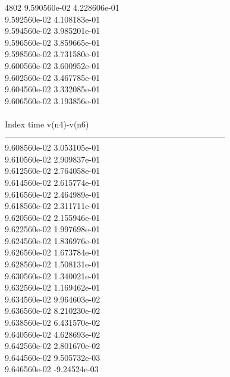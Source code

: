 4802	9.590560e-02	4.228606e-01	\\ 	9.592560e-02	4.108183e-01	\\ 	9.594560e-02	3.985201e-01	\\ 	9.596560e-02	3.859665e-01	\\ 	9.598560e-02	3.731580e-01	\\ 	9.600560e-02	3.600952e-01	\\ 	9.602560e-02	3.467785e-01	\\ 	9.604560e-02	3.332085e-01	\\ 	9.606560e-02	3.193856e-01	\\ \hline
\\ \hline
Index   time            v(n4)-v(n6)     \\ \hline
--------------------------------------------------------------------------------\\ 	9.608560e-02	3.053105e-01	\\ 	9.610560e-02	2.909837e-01	\\ 	9.612560e-02	2.764058e-01	\\ 	9.614560e-02	2.615774e-01	\\ 	9.616560e-02	2.464989e-01	\\ 	9.618560e-02	2.311711e-01	\\ 	9.620560e-02	2.155946e-01	\\ 	9.622560e-02	1.997698e-01	\\ 	9.624560e-02	1.836976e-01	\\ 	9.626560e-02	1.673784e-01	\\ 	9.628560e-02	1.508131e-01	\\ 	9.630560e-02	1.340021e-01	\\ 	9.632560e-02	1.169462e-01	\\ 	9.634560e-02	9.964603e-02	\\ 	9.636560e-02	8.210230e-02	\\ 	9.638560e-02	6.431570e-02	\\ 	9.640560e-02	4.628693e-02	\\ 	9.642560e-02	2.801670e-02	\\ 	9.644560e-02	9.505732e-03	\\ 	9.646560e-02	-9.24524e-03	\\ \hline
